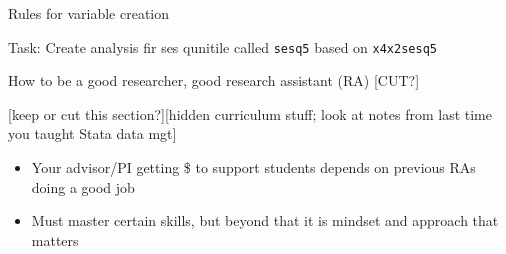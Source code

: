 \documentclass[8pt,ignorenonframetext,dvipsnames]{beamer}
\newenvironment{Shaded}{\begin{snugshade}}{\end{snugshade}}
\newcommand{\KeywordTok}[1]{\textcolor[rgb]{0.13,0.29,0.53}{\textbf{#1}}}
\newcommand{\DataTypeTok}[1]{\textcolor[rgb]{0.13,0.29,0.53}{#1}}
\newcommand{\DecValTok}[1]{\textcolor[rgb]{0.00,0.00,0.81}{#1}}
\newcommand{\StringTok}[1]{\textcolor[rgb]{0.31,0.60,0.02}{#1}}
\newcommand{\CommentTok}[1]{\textcolor[rgb]{0.56,0.35,0.01}{\textit{#1}}}
\newcommand{\OtherTok}[1]{\textcolor[rgb]{0.56,0.35,0.01}{#1}}
\newcommand{\OperatorTok}[1]{\textcolor[rgb]{0.81,0.36,0.00}{\textbf{#1}}}
\newcommand{\NormalTok}[1]{#1}
\providecommand{\tightlist}{%
  \setlength{\itemsep}{0pt}\setlength{\parskip}{0pt}}
\renewcommand{\textbf}[1]{{\color{darkgray}\bfseries\fontfamily{Montserrat-TOsF}#1}}
\begin{document}
\begin{frame}[fragile]{Rules for variable creation}

Task: Create analysis fir ses qunitile called \texttt{sesq5} based on
\texttt{x4x2sesq5}

\begin{Shaded}
\end{Shaded}

\end{frame}

\begin{frame}{How to be a good researcher, good research assistant (RA)
{[}CUT?{]}}

{[}keep or cut this section?{]}{[}hidden curriculum stuff; look at notes
from last time you taught Stata data mgt{]}

\begin{itemize}
\tightlist
\item
  Your advisor/PI getting \$ to support students depends on previous RAs
  doing a good job
\item
  Must master certain skills, but beyond that it is mindset and approach
  that matters
\end{itemize}

\end{frame}
\end{document}
